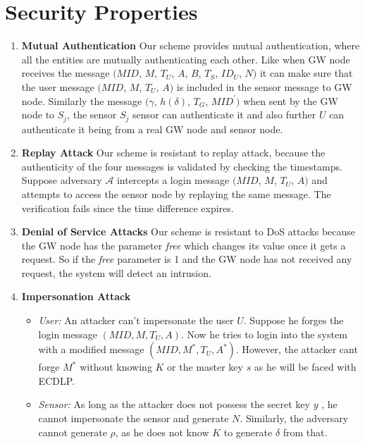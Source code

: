 \documentclass[a4paper,12pt]{report}
\begin{document}
\section{Security Properties}
\begin{enumerate}
\item\textbf{Mutual Authentication}
Our scheme provides mutual authentication, where all the entities
are mutually authenticating each other. Like when GW node receives
the message $(MID$, $M$, $T_{U}$, $A$, $B$, $T_{S}$, $ID_{U}$, $N)$
it can make sure that the user message $(MID$, $M$, $T_{U}$, $A)$ is
included in the sensor message to GW node. Similarly the message
$(\gamma$, $h(\delta)$, $T_{G}$, $MID^{\prime})$ when sent by the GW
node to $S_{j}$, the sensor $S_{j}$ sensor can authenticate it and
also further $U$ can authenticate it being from a real GW node and
sensor node.

\item\textbf{Replay Attack}
Our scheme is resistant to replay attack, because the authenticity
of the four messages is validated by checking the timestamps.
Suppose adversary $\mathcal{A}$ intercepts a login message $(MID$,
$M$, $T_{U}$, $A)$ and attempts to access the sensor node by
replaying the same message. The verification fails since the time
difference expires.

\item \textbf{Denial of Service Attacks}
Our scheme is resistant to DoS attacks because the GW node has the
parameter \textit{free} which changes its value once it gets a
request. So if the \textit{free} parameter is 1 and the GW node has
not received any request, the system will detect an intrusion.

\item\textbf{Impersonation Attack}
\begin{itemize}
\item \textit{User:} An attacker can't impersonate the user $U$.
Suppose he forges the login message $(MID, M, T_{U}, A)$. Now he
tries to login into the system with a modified message $(MID, M^{*},
T_{U}, A^{*})$. However, the attacker cant forge $M^{*}$ without
knowing $K$ or the master key $s$ as he will be faced with ECDLP.

\item \textit{Sensor:} As long as the attacker does not possess the
secret key $y$ , he cannot impersonate the sensor and generate $N$.
Similarly, the adversary cannot generate $\rho$, as he does not know
$K$ to generate $\delta$ from that.


\end{itemize}
\end{enumerate}
\end{document}
